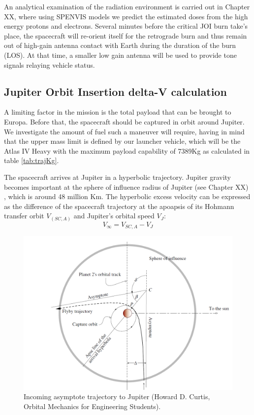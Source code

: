 An analytical examination of the radiation environment is carried out in Chapter XX, where using SPENVIS models we predict the estimated doses from the high energy protons and electrons. Several minutes before the critical JOI burn take’s place, the spacecraft will re-orient itself for the retrograde burn and thus remain out of high-gain antenna contact with Earth during the duration of the burn (LOS). At that time, a smaller low gain antenna will be used to provide tone signals relaying vehicle status. 
\subsection{Jupiter Orbit Insertion delta-V calculation}
A limiting factor in the mission is the total payload that can be brought to Europa. Before that, the spacecraft should be captured in orbit around Jupiter. We investigate the amount of fuel such a maneuver will require, having in mind that the upper mass limit is defined by our launcher vehicle, which will be the Atlas IV Heavy with the maximum payload capability of 7389Kg as calculated in table \ref{tab:trajKg}.

The spacecraft arrives at Jupiter in a hyperbolic trajectory. Jupiter gravity becomes important at the sphere of influence radius of Jupiter (see Chapter XX)
, which is around 48 million Km. The hyperbolic excess velocity can be expressed as the difference of the spacecraft trajectory at the apoapsis of its Hohmann transfer orbit $V_(SC,A)$ and Jupiter’s orbital speed $V_J$:
\begin{equation}
V_\infty=V_{SC,A}-V_J
\end{equation}

\begin{figure}[htb]
\centering
\includegraphics[scale=0.3]{figures/Orbiter/capture.png}
\caption{Incoming asymptote trajectory to Jupiter (Howard D. Curtis, Orbital Mechanics for Engineering Students).\cite{orbitals}}
\label{fig:capture}
\end{figure}

